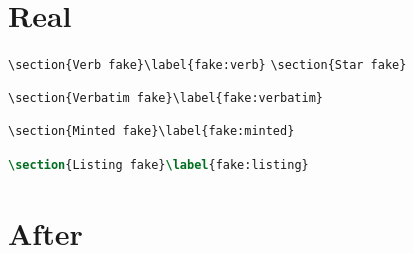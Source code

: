 \section{Real}
\verb|\section{Verb fake}\label{fake:verb}|
\verb*+\section{Star fake}+
\begin{verbatim}
\section{Verbatim fake}\label{fake:verbatim}
\end{verbatim}
\begin{verbatim}
\section{Minted fake}\label{fake:minted}
\end{verbatim}
\begin{lstlisting}[language=TeX]
\section{Listing fake}\label{fake:listing}
\end{lstlisting}
\section{After}
